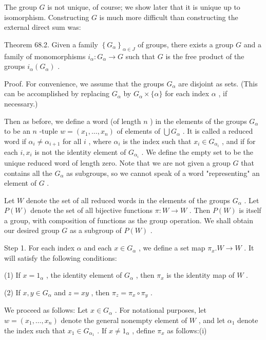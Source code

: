 The group \(G\) is not unique, of course; we show later that it is unique up to isomorphism. Constructing \(G\) is much more difficult than constructing the external direct sum was:

Theorem 68.2. Given a family \({\left\{  {G}_{\alpha }\right\}  }_{\alpha  \in  J}\) of groups, there exists a group \(G\) and a family of monomorphisms \({i}_{\alpha } : {G}_{\alpha } \rightarrow  G\) such that \(G\) is the free product of the groups \({i}_{\alpha }\left( {G}_{\alpha }\right)\) .

Proof. For convenience, we assume that the groups \({G}_{\alpha }\) are disjoint as sets. (This can be accomplished by replacing \({G}_{\alpha }\) by \({G}_{\alpha } \times  \{ \alpha \}\) for each index \(\alpha\) , if necessary.)

Then as before, we define a word (of length \(n\) ) in the elements of the groups \({G}_{\alpha }\) to be an \(n\) -tuple \(w = \left( {{x}_{1},\ldots ,{x}_{n}}\right)\) of elements of \(\bigcup {G}_{\alpha }\) . It is called a reduced word if \({\alpha }_{i} \neq  {\alpha }_{i + 1}\) for all \(i\) , where \({\alpha }_{i}\) is the index such that \({x}_{i} \in  {G}_{{\alpha }_{i}}\) , and if for each \(i,{x}_{i}\) is not the identity element of \({G}_{{\alpha }_{i}}\) . We define the empty set to be the unique reduced word of length zero. Note that we are not given a group \(G\) that contains all the \({G}_{\alpha }\) as subgroups, so we cannot speak of a word "representing" an element of \(G\) .

Let \(W\) denote the set of all reduced words in the elements of the groups \({G}_{\alpha }\) . Let \(P\left( W\right)\) denote the set of all bijective functions \(\pi  : W \rightarrow  W\) . Then \(P\left( W\right)\) is itself a group, with composition of functions as the group operation. We shall obtain our desired group \(G\) as a subgroup of \(P\left( W\right)\) .

Step 1. For each index \(\alpha\) and each \(x \in  {G}_{\alpha }\) , we define a set map \({\pi }_{x}.W \rightarrow  W\) . It will satisfy the following conditions:

(1) If \(x = {1}_{\alpha }\) , the identity element of \({G}_{\alpha }\) , then \({\pi }_{x}\) is the identity map of \(W\) .

(2) If \(x,y \in  {G}_{\alpha }\) and \(z = {xy}\) , then \({\pi }_{z} = {\pi }_{x} \circ  {\pi }_{y}\) .

We proceed as follows: Let \(x \in  {G}_{\alpha }\) . For notational purposes, let \(w = \left( {{x}_{1},\ldots ,{x}_{n}}\right)\) denote the general nonempty element of \(W\) , and let \({\alpha }_{1}\) denote the index such that \({x}_{1} \in  {G}_{{\alpha }_{1}}\) . If \(x \neq  {1}_{\alpha }\) , define \({\pi }_{x}\) as follows:(i)

